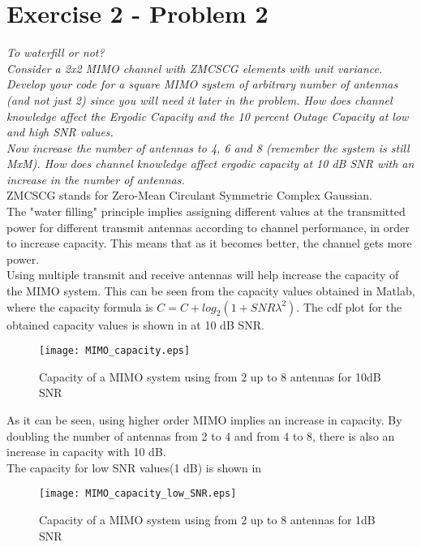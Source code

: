 \section{Exercise 2 - Problem 2}
\textit{To waterfill or not?}\\

\textit{Consider a 2x2 MIMO channel with ZMCSCG elements with unit variance. Develop your code for a square MIMO system of arbitrary number of antennas (and not just 2) since you will need it later in the problem. How does channel knowledge affect the Ergodic Capacity and the 10 percent Outage Capacity at low and high SNR values.} \\

\textit{Now increase the number of antennas to 4, 6 and 8 (remember the system is still MxM). How does channel knowledge affect ergodic capacity at 10 dB SNR with an increase in the number of antennas.}\\

ZMCSCG stands for Zero-Mean Circulant Symmetric Complex Gaussian. \\

The "water filling" principle implies assigning different values at the transmitted power for different transmit antennas according to channel performance, in order to increase capacity. This means that as it becomes better, the channel gets more power. \\

Using multiple transmit and receive antennas will help increase the capacity of the MIMO system. This can be seen from the capacity values obtained in Matlab, where the capacity formula is $C=C+log_{2}(1+SNR \lambda ^{2})$. The cdf plot for the obtained capacity values is shown in  at 10 dB SNR.
\begin{figure}[!h]
  \centering
  \texttt{[image: MIMO\_capacity.eps]}
  \caption{Capacity of a MIMO system using from 2 up to 8 antennas for 10dB SNR}
  \label{fig:MIMO_capacity}
\end{figure}
As it can be seen, using higher order MIMO implies an increase in capacity. By doubling the number of antennas from 2 to 4 and from 4 to 8, there is also an increase in capacity with 10 dB. \\

The capacity for low SNR values(1 dB) is shown in 
\begin{figure}[!h]
  \centering
  \texttt{[image: MIMO\_capacity\_low\_SNR.eps]}
  \caption{Capacity of a MIMO system using from 2 up to 8 antennas for 1dB SNR}
  \label{fig:MIMO_capacity_low_SNR}
\end{figure}
